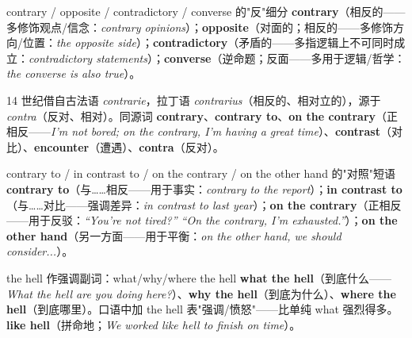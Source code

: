 \documentclass[../main.tex]{subfiles}
\begin{document}
\begin{lex}{contrary / opposite / contradictory / converse 的"反"细分}
\textbf{contrary}（相反的——多修饰观点/信念：\textit{contrary opinions}）；\textbf{opposite}（对面的；相反的——多修饰方向/位置：\textit{the opposite side}）；\textbf{contradictory}（矛盾的——多指逻辑上不可同时成立：\textit{contradictory statements}）；\textbf{converse}（逆命题；反面——多用于逻辑/哲学：\textit{the converse is also true}）。
\end{lex}

\begin{origin}
14 世纪借自古法语 \textit{contrarie}，拉丁语 \textit{contrarius}（相反的、相对立的），源于 \textit{contra}（反对、相对）。同源词 \textbf{contrary}、\textbf{contrary to}、\textbf{on the contrary}（正相反——\textit{I'm not bored; on the contrary, I'm having a great time}）、\textbf{contrast}（对比）、\textbf{encounter}（遭遇）、\textbf{contra}（反对）。
\end{origin}



\begin{gram}{contrary to / in contrast to / on the contrary / on the other hand 的"对照"短语}
\textbf{contrary to}（与……相反——用于事实：\textit{contrary to the report}）；\textbf{in contrast to}（与……对比——强调差异：\textit{in contrast to last year}）；\textbf{on the contrary}（正相反——用于反驳：\textit{``You're not tired?'' ``On the contrary, I'm exhausted.''}）；\textbf{on the other hand}（另一方面——用于平衡：\textit{on the other hand, we should consider...}）。
\end{gram}




\begin{gram}{the hell 作强调副词：what/why/where the hell}
\textbf{what the hell}（到底什么——\textit{What the hell are you doing here?}）、\textbf{why the hell}（到底为什么）、\textbf{where the hell}（到底哪里）。口语中加 the hell 表"强调/愤怒"——比单纯 what 强烈得多。\textbf{like hell}（拼命地；\textit{We worked like hell to finish on time}）。
\end{gram}
\end{document}
